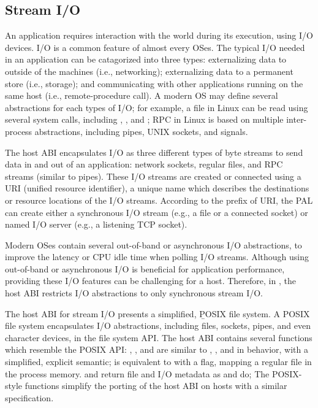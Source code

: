 \subsection{Stream I/O}
\label{sec:abi:streams}



An application requires interaction with the world during its execution, using I/O devices.
I/O is a common feature of almost every OSes.
The typical I/O needed in an application
can be catagorized into three types:
externalizing data to outside of the machines (i.e., networking);
externalizing data to a permanent store (i.e., storage);
and communicating with other applications running on the same host (i.e., remote-procedure call).
A modern OS may define several abstractions
for each types of I/O; for example, a file in Linux can be read using several system calls,
including , , and ;
RPC in Linux is based on multiple inter-process abstractions,
including pipes, UNIX sockets, and signals.




The host ABI
encapsulates I/O as three different types of byte streams
to send data in and out of an application:
network sockets, regular files, and RPC streams (similar to pipes).
These I/O streams
are created or connected using a URI (unified resource identifier),
a unique name which describes the destinations or resource locations of the I/O streams.
According to the prefix of URI,
the PAL can create either a synchronous I/O stream (e.g., a file or a connected socket)
or named I/O server (e.g., a listening TCP socket).


Modern OSes contain several out-of-band or asynchronous I/O abstractions, to improve the latency or CPU idle time
when polling I/O streams.
Although using out-of-band or asynchronous I/O is beneficial for application performance,
providing these I/O features can be challenging for a host.
Therefore, in \graphene{}, the host ABI restricts I/O abstractions to only synchronous stream I/O.



The host ABI for stream I/O presents a simplified, {\b POSIX file system}.
A POSIX file system
encapsulates I/O abstractions,
including files, sockets, pipes, and even character devices,
in the file system API.
The host ABI contains several functions
which resemble the POSIX API:
, , and 
are similar to , , and  in behavior, with a simplified, explicit semantic;
 is equivalent to  with a  flag, mapping a regular file in the process memory. %
 and 
return file and I/O metadata
as  and  do;
The POSIX-style functions simplify the porting of the host ABI
on hosts with a similar specification.






